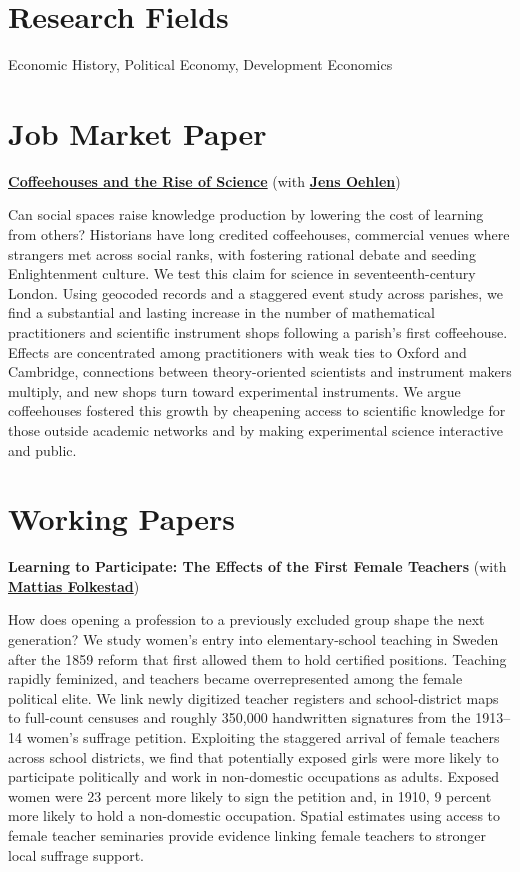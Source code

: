 \documentclass[a4paper]{article}
\newcommand{\paperentry}[3]{%
  \noindent\textbf{#1} #2\par
  \smallskip
  {#3\par}
  \medskip
}
\begin{document}
\section*{Research Fields}

Economic History, Political Economy, Development Economics

\section*{Job Market Paper}

\paperentry
{\href{https://www.monirbounadi.com/jmp.pdf}{Coffeehouses and the Rise of Science}}
{(with \href{https://jensoehlen.github.io/}{\textbf{Jens Oehlen}})}
{Can social spaces raise knowledge production by lowering the cost of learning from others? Historians have long credited coffeehouses, commercial venues where strangers met across social ranks, with fostering rational debate and seeding Enlightenment culture. We test this claim for science in seventeenth-century London. Using geocoded records and a staggered event study across parishes, we find a substantial and lasting increase in the number of mathematical practitioners and scientific instrument shops following a parish's first coffeehouse. Effects are concentrated among practitioners with weak ties to Oxford and Cambridge, connections between theory-oriented scientists and instrument makers multiply, and new shops turn toward experimental instruments. We argue coffeehouses fostered this growth by cheapening access to scientific knowledge for those outside academic networks and by making experimental science interactive and public.}

\section*{Working Papers}

\paperentry
{Learning to Participate: The Effects of the First Female Teachers}
{(with \href{https://mattiasfolkestad.com/}{\textbf{Mattias Folkestad}})}
{How does opening a profession to a previously excluded group shape the next generation? We study women's entry into elementary-school teaching in Sweden after the 1859 reform that first allowed them to hold certified positions. Teaching rapidly feminized, and teachers became overrepresented among the female political elite. We link newly digitized teacher registers and school-district maps to full-count censuses and roughly 350,000 handwritten signatures from the 1913--14 women's suffrage petition. Exploiting the staggered arrival of female teachers across school districts, we find that potentially exposed girls were more likely to participate politically and work in non-domestic occupations as adults. Exposed women were 23 percent more likely to sign the petition and, in 1910, 9 percent more likely to hold a non-domestic occupation. Spatial estimates using access to female teacher seminaries provide evidence linking female teachers to stronger local suffrage support.}
\end{document}

